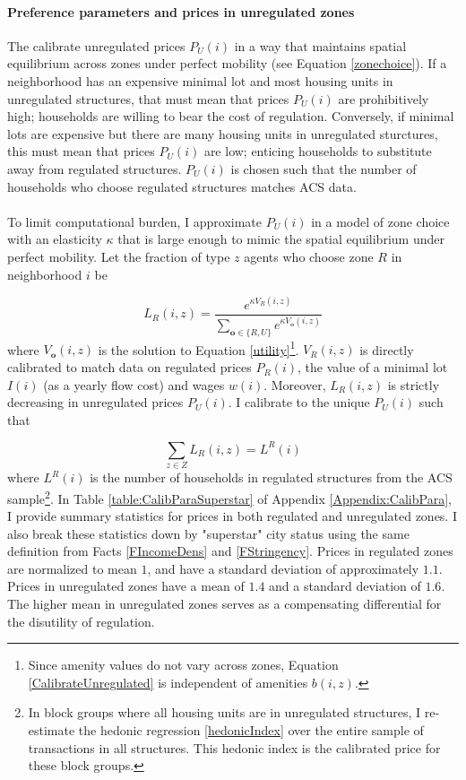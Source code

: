 \documentclass[12pt]{article}
\begin{document}
\paragraph*{Preference parameters and prices in unregulated zones} The calibrate unregulated prices $P_{U}(i)$ in a way that maintains spatial equilibrium across zones under perfect mobility (see Equation \ref{zonechoice}). If a neighborhood has an expensive minimal lot and most housing units in unregulated structures, that must mean that prices $P_{U}(i)$ are prohibitively high; households are willing to bear the cost of regulation. Conversely, if minimal lots are expensive but there are many housing units in unregulated sturctures, this must mean that prices $P_{U}(i)$ are low; enticing households to substitute away from regulated structures. $P_{U}(i)$ is chosen such that the number of households who choose regulated structures matches ACS data. 

\paragraph*{}
To limit computational burden, I approximate $P_{U}(i)$ in a model of zone choice with an elasticity $\kappa$ that is large enough to mimic the spatial equilibrium under perfect mobility. Let the fraction of type $z$ agents who choose zone $R$ in neighborhood $i$ be 

\begin{equation}\label{CalibrateUnregulated}
	L_{R}(i, z) = \frac{e^{\kappa V_{R}(i, z)}}{\sum_{\boldsymbol{o} \in \{R, U\}}e^{\kappa V_{\boldsymbol{o}}(i, z)}}
\end{equation}
where $V_{\boldsymbol{o}}(i, z)$ is the solution to Equation \eqref{utility}\footnote{Since amenity values do not vary across zones, Equation \ref{CalibrateUnregulated} is independent of amenities $b(i, z)$.}. $V_{R}(i, z)$ is directly calibrated to match data on regulated prices $P_{R}(i)$, the value of a minimal lot $I(i)$ (as a yearly flow cost) and wages $w(i)$. Moreover, $L_{R}(i, z)$ is strictly decreasing in unregulated prices $P_{U}(i)$. I calibrate to the unique $P_{U}(i)$ such that 

\begin{equation*}
	\sum_{z \in Z}L_{R}(i, z) = L^{R}(i)
\end{equation*}
where $L^{R}(i)$ is the number of households in regulated structures from the ACS sample\footnote{In block groups where all housing units are in unregulated structures, I re-estimate the hedonic regression \eqref{hedonicIndex} over the entire sample of transactions in all structures. This hedonic index is the calibrated price for these block groups.}. In Table \ref{table:CalibParaSuperstar} of Appendix \ref{Appendix:CalibPara}, I provide summary statistics for prices in both regulated and unregulated zones. I also break these statistics down by "superstar" city status using the same definition from Facts \ref{FIncomeDens} and \ref{FStringency}. Prices in regulated zones are normalized to mean $1$, and have a standard deviation of approximately $1.1$. Prices in unregulated zones have a mean of $1.4$ and a standard deviation of $1.6$. The higher mean in unregulated zones serves as a compensating differential for the disutility of regulation. 
  
\end{document}
